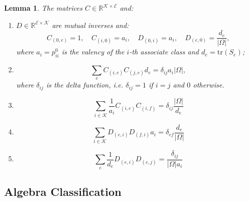 \documentclass{article}
\theoremstyle{plain}
\newtheorem{lemma}{Lemma}[section]
\numberwithin{equation}{section}
\theoremstyle{definition}
\theoremstyle{remark}
\begin{document}
\begin{lemmaproofbox}
    \begin{lemma} \label{lemma:characters}The matrices $C \in \mathbb{R}^{\mathcal{K\times E}}$ and:
    \begin{enumerate}[label=(\roman*)]
        \item $D\in\mathbb{R}^{\mathcal{E\times K}} $ are mutual inverses and: $$C_{(0, e)} = 1, \quad C_{(i, 0)} = a_i , \quad D_{(0, i)} = a_i,  \quad D_{(e, 0)} = \frac{d_e}{|\Omega|},$$
        where $a_i = p_{ii}^0$ is the valency of the $i$-th associate class and $d_e = \text{tr}(S_e)$;
        \item $$\sum_{e}C_{(i, e)}C_{(j, e)}d_e = \delta_{ij} a_i|\Omega|, $$ where $\delta_{ij}$ is the delta function, i.e. $\delta_{ij}=1$ if $i=j$ and $0$ otherwise. 
        \item $$\sum_{i\in \mathcal{K}}\frac{1}{a_i}C_{(i, e)}C_{(i, f)} = \delta_{ij} \frac{|\Omega|}{d_e}$$
        \item $$\sum_{i\in \mathcal{K}} D_{(e, i)}D_{(f, i)}a_i = \delta_{ef} \frac{d_e}{|\Omega|}$$
        \item $$\sum_{e}\frac{1}{d_e}D_{(e, i)}D_{(e, j)} = \frac{\delta_{ij}}{|\Omega|a_i}$$
        \end{enumerate}
    \end{lemma}
\end{lemmaproofbox}

\subsection{Algebra Classification}
\label{appendix:algebra_classification}
\end{document}
